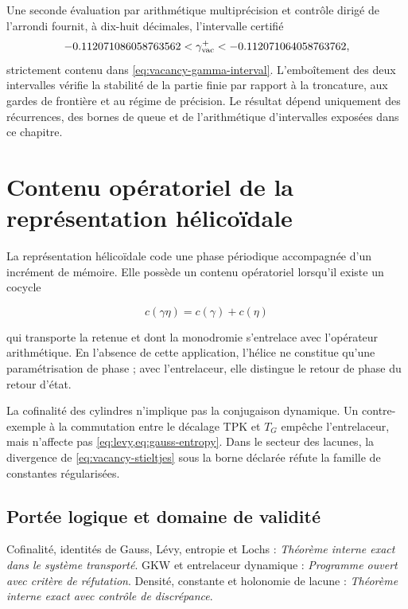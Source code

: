 Une seconde évaluation par arithmétique multiprécision et contrôle dirigé
de l'arrondi fournit, à dix-huit décimales, l'intervalle certifié
\[
-0.112071086058763562
<\gamma_{\rm vac}^{+}
<-0.112071064058763762,
\]
strictement contenu dans \cref{eq:vacancy-gamma-interval}. L'emboîtement des
deux intervalles vérifie la stabilité de la partie finie par rapport à la
troncature, aux gardes de frontière et au régime de précision. Le
résultat dépend uniquement des récurrences, des bornes de queue et de
l'arithmétique d'intervalles exposées dans ce chapitre.

\section{Contenu opératoriel de la représentation hélicoïdale}

La représentation hélicoïdale code une phase périodique accompagnée d'un
incrément de mémoire. Elle possède un contenu opératoriel lorsqu'il existe un cocycle

\[
c(\gamma\eta)=c(\gamma)+c(\eta)
\]

qui transporte la retenue et dont la monodromie s'entrelace avec l'opérateur
arithmétique. En l'absence de cette application, l'hélice ne constitue qu'une
paramétrisation de phase ; avec l'entrelaceur, elle distingue le retour de phase
du retour d'état.

\begin{remark}
La cofinalité des cylindres n'implique pas la conjugaison dynamique. Un
contre-exemple à la commutation entre le décalage TPK et \(T_G\)
empêche l'entrelaceur, mais n'affecte pas
\cref{eq:levy,eq:gauss-entropy}. Dans le secteur des lacunes, la divergence
de \cref{eq:vacancy-stieltjes} sous la borne déclarée réfute la famille de
constantes régularisées.
\end{remark}

\subsection*{Portée logique et domaine de validité}
Cofinalité, identités de Gauss, Lévy, entropie et Lochs : \emph{Théorème interne exact dans le système transporté}. GKW et entrelaceur dynamique : \emph{Programme ouvert avec critère de réfutation}. Densité, constante et holonomie de lacune : \emph{Théorème interne exact avec contrôle de discrépance}.
